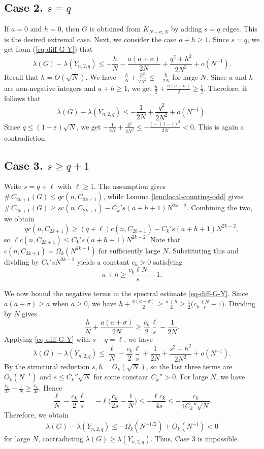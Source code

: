 \documentclass[11pt,a4paper]{article}
\theoremstyle{definition}
\theoremstyle{plain}
\newcommand{\eps}{\varepsilon}
\renewcommand{\le}{\leqslant}
\renewcommand{\ge}{\geqslant}
\begin{document}
\subsection*{Case 2. $s=q$}

If $a=0$ and $h=0$, then $G$ is obtained from $K_{N+\sigma, N}$ by adding $s=q$ edges. 
This is the desired extremal case.  
Next, we consider the case $ a+h\ge 1$. 
Since $s=q$, we get from (\ref{eq-diff-G-Y}) that  
\[  \lambda(G)-\lambda(Y_{n,2,q})
        \le
        -\frac hN-\frac{a(a+\sigma)}{2N}
        +\frac{q^2+h^2}{2N^2}+o(N^{-1}).
\]
Recall that $h=O(\sqrt N)$. We have $  -\frac hN+\frac{h^2}{2N^2}\le -\frac{h}{2N}$ 
for large $N$.  Since $a$ and $h$ are non-negative integers and $a+h\ge1$, we get 
$  \frac{h}{2}+\frac{a(a+\sigma)}2\ge \frac12$. 
Therefore, it follows that 
\[
        \lambda(G)-\lambda(Y_{n,2,q})
        \le
        -\frac1{2N}+\frac{q^2}{2N^2}+o(N^{-1}).
\]
Since $q\le (1- \eps) \sqrt{N}$, we get $  -\frac1{2N}+\frac{q^2}{2N^2}
        \le
        -\frac{1-(1-\eps)^2}{2N}<0$. 
This is again a contradiction.

\subsection*{Case 3. $s\ge q+1$}

Write $s=q+\ell$ with $\ell\ge1$. The assumption gives $\texttt{\#}\, {C_{2k+1}}(G)\le qc(n,C_{2k+1})$, while Lemma \ref{lem:local-counting-odd} gives $\texttt{\#}\,{C_{2k+1}}(G)\ge s c(n,C_{2k+1}) - C_k' s(a+h+1)N^{2k-2}$. Combining the two, we obtain 
\[
    qc(n,C_{2k+1})\ge (q+\ell)c(n,C_{2k+1})-C_k' s(a+h+1)N^{2k-2},
\]
so $\ell c(n,C_{2k+1})\le C_k' s(a+h+1)N^{2k-2}$. Note that $c (n,C_{2k+1}) =\Omega_k(N^{2k-1})$ for sufficiently large $N$. Substituting this and dividing by $C_k' sN^{2k-2}$ yields a constant $c_k>0$ satisfying 
\[
    a+h\ge  \frac{c_k \ell N}{s}-1.
\]

We now bound the negative terms in the spectral estimate \eqref{eq-diff-G-Y}. 
Since $a(a+\sigma)\ge a$ when $a\ge 0$, we have 
$ h+\frac{a(a+\sigma)}2\ge\frac{a+h}2\ge\frac12\big(c_k\frac{\ell N}{s}-1\big)$. 
Dividing by $N$ gives 
$$\dfrac hN+\dfrac{a(a+\sigma)}{2N}\ge\dfrac{c_k}{2}\dfrac{\ell}{s}-\dfrac1{2N}. $$
Applying \eqref{eq-diff-G-Y} with $s-q=\ell$, we have 
\[
    \lambda(G)-\lambda(Y_{n,2,q})
    \le\frac{\ell}{N}-\frac{c_k}{2}\frac{\ell}{s}
    +\frac1{2N}+\frac{s^2+h^2}{2N^2}+o(N^{-1}).
\]
By the structural reduction $s,h=O_k(\sqrt N)$, so the last three terms are $O_k(N^{-1})$ and $s\le C_k''\sqrt N$ for some constant $C_k''>0$. For large $N$, we have $\frac{c_k}{2s}-\frac1N\ge\frac{c_k}{4s}$. Hence
\[
    \frac{\ell}{N}-\frac{c_k}{2}\frac{\ell}{s}
    =-\ell\Big(\frac{c_k}{2s}-\frac1N\Big)
    \le-\frac{\ell c_k}{4s} 
    \le-\frac{c_k}{4C_k''\sqrt{N}}.
\]
Therefore, we obtain 
\[
    \lambda(G)-\lambda(Y_{n,2,q})\le-\Omega_k(N^{-1/2})+O_k(N^{-1})<0
\]
for large $N$, contradicting $\lambda(G)\ge\lambda(Y_{n,2,q})$. Thus, Case 3 is impossible.
\end{document}
